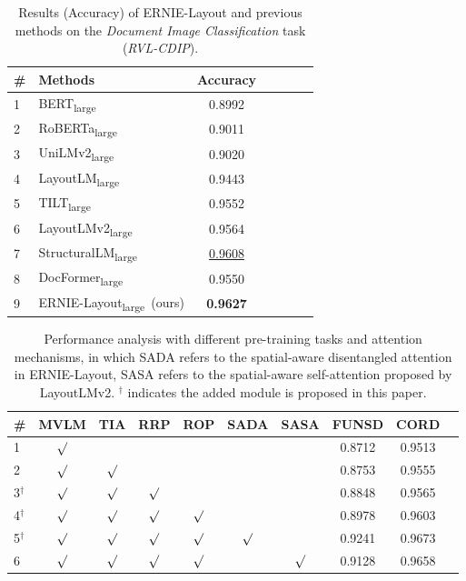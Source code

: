 \documentclass[11pt]{article}
\begin{document}
\begin{table}[t]
\centering
\small
\begin{tabular}{llccccc}
\toprule
\# & \textbf{Methods}                    & \textbf{Accuracy} \\
\midrule
1 & BERT\textsubscript{large} \cite{liu2019roberta} & 0.8992 \\
2 & RoBERTa\textsubscript{large} \cite{liu2019roberta} & 0.9011 \\
3 & UniLMv2\textsubscript{large} \cite{bao2020unilmv2} & 0.9020 \\
\midrule
4 & LayoutLM\textsubscript{large} \cite{xu2020layoutlm} & 0.9443 \\
5 & TILT\textsubscript{large} \cite{powalski2021going}  &  0.9552 \\
6 & LayoutLMv2\textsubscript{large} \cite{xu2021layoutlmv2} & 0.9564 \\
7 & StructuralLM\textsubscript{large} \cite{li2021structurallm} & \underline{0.9608} \\
8 & DocFormer\textsubscript{large}~\cite{appalaraju2021docformer} & 0.9550 \\
\midrule
\midrule
9 & ERNIE-Layout\textsubscript{large}~(ours) & \textbf{0.9627} \\ 
\bottomrule
\end{tabular}
\caption{Results (Accuracy) of ERNIE-Layout and previous methods on the \emph{Document Image Classification} task (\emph{RVL-CDIP}).}
\label{tab:main_result_document_classification}
\end{table}


\begin{table}[ht]
\centering
\small
\begin{tabular}{lccccccccc}
\toprule
\# &\textbf{MVLM} &\textbf{TIA} &\textbf{RRP} &\textbf{ROP} & \textbf{SADA} & \textbf{SASA} & \textbf{FUNSD} & \textbf{CORD} \\
\midrule
1   & $\surd$ &  &  &  &  &  & 0.8712 &0.9513 \\
2   & $\surd$ & $\surd$ &  &  &  &  & 0.8753 &0.9555\\
\midrule
3$^{\dag}$   & $\surd$ & $\surd$ & $\surd$ &  &  &  & 0.8848 & 0.9565\\
4$^{\dag}$   & $\surd$ & $\surd$ & $\surd$ & $\surd$ &  &  & 0.8978 &0.9603\\
5$^{\dag}$   & $\surd$ & $\surd$ & $\surd$ & $\surd$ & $\surd$ & & 0.9241 &0.9673\\
\midrule
6   & $\surd$ & $\surd$ & $\surd$ & $\surd$ & & $\surd$ & 0.9128 &0.9658\\
\bottomrule
\end{tabular}
\caption{Performance analysis with different pre-training tasks and attention mechanisms, in which SADA refers to the spatial-aware disentangled attention in ERNIE-Layout, SASA refers to the spatial-aware self-attention proposed by LayoutLMv2. $^\dag$ indicates the added module is proposed in this paper.} 
\label{tab:ablation_staudy}
\end{table}
\end{document}
